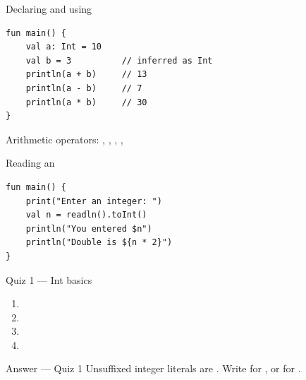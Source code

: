 \documentclass[aspectratio=169,11pt]{beamer}
\begin{document}
    \begin{frame}[fragile]{Declaring and using }
        \begin{lstlisting}
fun main() {
    val a: Int = 10
    val b = 3          // inferred as Int
    println(a + b)     // 13
    println(a - b)     // 7
    println(a * b)     // 30
}
        \end{lstlisting}
        \vspace{0.3em}
        Arithmetic operators: \kotlincode{+}, \kotlincode{-}, \kotlincode{*}, \kotlincode{/}, \kotlincode{\%}
    \end{frame}

    \begin{frame}[fragile]{Reading an }
        \begin{lstlisting}
fun main() {
    print("Enter an integer: ")
    val n = readln().toInt()
    println("You entered $n")
    println("Double is ${n * 2}")
}
        \end{lstlisting}
        \vspace{0.3em}
    \end{frame}

    \begin{frame}{Quiz 1 --- Int basics}
        \begin{enumerate}
            \item {}
            \item {}
            \item {}
            \item {}
        \end{enumerate}
        \quizpause
    \end{frame}

    \begin{frame}{Answer --- Quiz 1}
        \vspace{0.4em}
        Unsuffixed integer literals are .
        Write  for , or  for .
    \end{frame}

\end{document}
